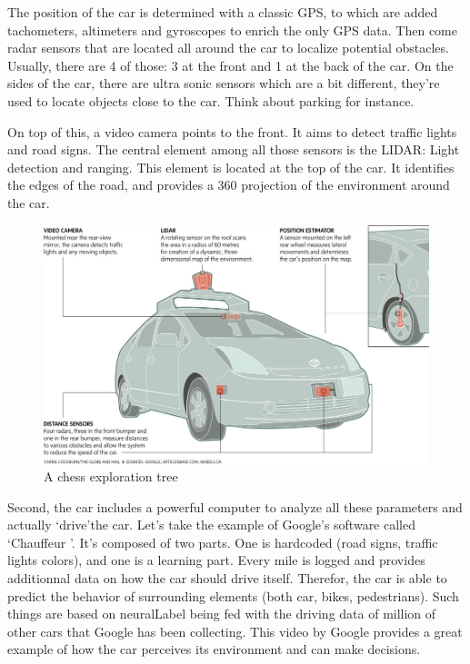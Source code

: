 \documentclass[12pt]{article}
\begin{document}
The position of the car is determined with a classic GPS, to which are added
tachometers, altimeters and gyroscopes to enrich the only GPS data. Then come
radar sensors that are located all around the car to localize potential
obstacles. Usually, there are 4 of those: 3 at the front and 1 at the back of
the car. On the sides of the car, there are ultra sonic sensors which are a bit
different, they're used to locate objects close to the car. Think about parking
for instance.

\noindent On top of this, a video camera points to the front. It aims to detect
traffic lights and road signs. The central element among all those sensors is
the LIDAR: Light detection and ranging. This element is located at the top of
the car. It identifies the edges of the road, and provides a 360 projection of
the environment around the car.

\smallskip

\begin{figure}[h]
    \centering
    \includegraphics[width=\linewidth]{car-diagram}
    \caption{A chess exploration tree}
    \label{fig:car}
\end{figure}

\smallskip

Second, the car includes a powerful computer to analyze all these parameters
and actually \lq drive\rq the car. Let's take the example of Google's software
called \lq Chauffeur \rq . It's composed of two parts. One is hardcoded
(road signs, traffic lights colors), and one is a learning part. Every mile is
logged and provides additionnal data on how the car should drive itself.
Therefor, the car is able to predict the behavior of surrounding elements
(both car, bikes, pedestrians). Such things are based on \gls{neuralLabel} being
fed with the driving data of million of other cars
that Google has been collecting. This video by Google provides a great example
of how the car perceives its environment and can make decisions.
\end{document}
